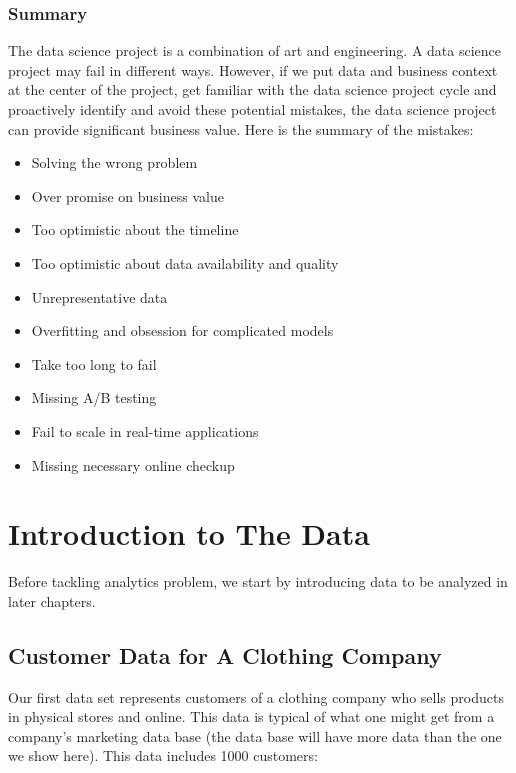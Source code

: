 \documentclass[12pt,]{krantz}
\providecommand{\tightlist}{%
  \setlength{\itemsep}{0pt}\setlength{\parskip}{0pt}}
\begin{document}
\hypertarget{summary-1}{%
\subsection{Summary}\label{summary-1}}

The data science project is a combination of art and engineering. A data science project may fail in different ways. However, if we put data and business context at the center of the project, get familiar with the data science project cycle and proactively identify and avoid these potential mistakes, the data science project can provide significant business value. Here is the summary of the mistakes:

\begin{itemize}
\tightlist
\item
  Solving the wrong problem
\item
  Over promise on business value
\item
  Too optimistic about the timeline
\item
  Too optimistic about data availability and quality
\item
  Unrepresentative data
\item
  Overfitting and obsession for complicated models
\item
  Take too long to fail
\item
  Missing A/B testing
\item
  Fail to scale in real-time applications
\item
  Missing necessary online checkup
\end{itemize}

\hypertarget{introduction-to-the-data}{%
\chapter{Introduction to The Data}\label{introduction-to-the-data}}

Before tackling analytics problem, we start by introducing data to be analyzed in later chapters.

\hypertarget{customer-data-for-a-clothing-company}{%
\section{Customer Data for A Clothing Company}\label{customer-data-for-a-clothing-company}}

Our first data set represents customers of a clothing company who sells products in physical stores and online. This data is typical of what one might get from a company's marketing data base (the data base will have more data than the one we show here). This data includes 1000 customers:
\end{document}
